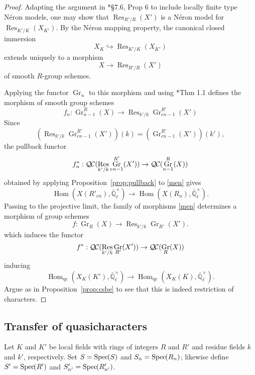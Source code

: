 \documentclass{amsart}
\theoremstyle{plain}
\theoremstyle{definition}
\theoremstyle{remark}
\newcommand{\EE}{\mathbb{\bar Q}_\ell}
\newcommand{\Fq}{k}
\newcommand{\EEx}{\EE^\times}
\DeclareMathOperator{\Hom}{Hom}
\DeclareMathOperator{\Gr}{Gr}
\DeclareMathOperator{\Res}{Res}
\newcommand{\Spec}[1]{{\operatorname{Spec}\hskip-1pt( #1 )}}
\newcommand{\QC}{{\mathcal{Q\hskip-0.8pt C}}}
\begin{document}
\begin{proof}
Adapting the argument in \cite{bosch-lutkebohmert-reynaud:NeronModels}*{\S 7.6, Prop 6} to include locally finite type Néron models,
one may show that $\Res_{R'/R}(X')$ is a Néron model for $\Res_{K'/K}(X_{K'})$.
By the Néron mapping property, the canonical closed immersion
\[
X_K\hookrightarrow \Res_{K'/K}(X_{K'})
\]
 extends uniquely to a morphism
\[
X\to \Res_{R'/R}(X')
\]
 of smooth $R$-group schemes.

Applying the functor $\Gr_{n}$ to this morphism
and using \cite{bertrapelle-gonzales:Greenberg}*{Thm 1.1} defines the morphism of smooth group schemes
\begin{equation}\label{men}
f_n: \Gr_{n-1}^R(X) \to \Res_{k'/k} \Gr_{en-1}^{R'}(X')
\end{equation}
Since 
\[
\left(\Res_{k'/k} \Gr_{en-1}^{R'}(X') \right)(\Fq) = \left(\Gr_{en-1}^{R'}(X')\right)(k'),
\]
the pullback functor 
\[
f_n^* : \QC(\Res_{k'/k} \Gr_{en-1}^{R'}(X'))\to \QC(\Gr_{n-1}^{R}(X))
\]
obtained by applying Proposition~\ref{prop:pullback} to \eqref{men} gives
\[
\Hom(X(R'_{en}),\EEx) \to \Hom(X(R_n),\EEx).
\]
Passing to the projective limit, the family of morphisms \eqref{men} determines a morphism of group schemes
\[
f: \Gr_R(X) \to \Res_{k'/k} \Gr_{R'}(X').
\]
which induces the functor
\[
f^* : \QC(\Res_{k'/k} \Gr_{R'}(X'))\to \QC(\Gr_{R}(X))
\]
inducing
\[
\Hom_{\text{qc}}(X_K(K'),\EEx) \to \Hom_{\text{qc}}(X_K(K),\EEx).
\]
Argue as in Proposition~\ref{prop:csbe} to see that this is indeed restriction of characters.
\end{proof}

\subsection{Transfer of quasicharacters}\label{sec:transfer}

Let $K$ and $K'$ be local fields with rings of integers $R$ and $R'$ and residue fields $k$ and $k'$, respectively. Set $S = \Spec{S}$ and $S_n = \Spec{R_n}$; likewise define $S' = \Spec{R'}$ and $S'_{n'} = \Spec{R'_{n'}}$.
\end{document}
